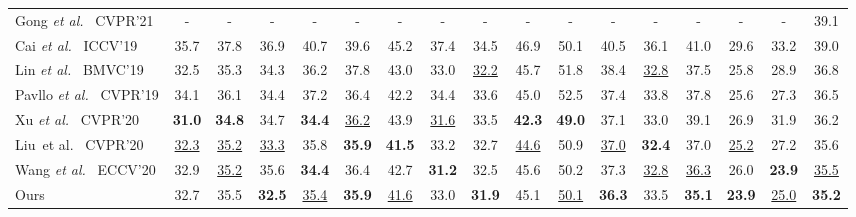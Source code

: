 \documentclass[journal]{IEEEtran}
\begin{document}
\begin{table*}[t]
{\begin{tabular}{@{}l|ccccccccccccccc|c@{}}
Gong \emph{et al.}~\cite{gong2021poseaug} CVPR'21  &- &- &- &- &- &- &- &- &- &- &- &- &- &- &-  &39.1 \\

Cai \emph{et al.}~\cite{cai2019exploiting} ICCV'19   &35.7 &37.8 &36.9 &40.7 &39.6 &45.2 &37.4 &34.5 &46.9 &50.1 &40.5 &36.1 &41.0 &29.6 &33.2 &39.0 \\

Lin \emph{et al.}~\cite{lin2019trajectory} BMVC'19   &32.5 &35.3 &34.3 &36.2 &37.8 &43.0 &33.0 &\underline{32.2} &45.7 &51.8 &38.4 &\underline{32.8} &37.5 &25.8 &28.9 &36.8 \\

Pavllo \emph{et al.}~\cite{pavllo20193d} CVPR'19  &34.1 &36.1 &{34.4} &37.2 &{36.4} &42.2 &34.4 &33.6 &45.0 &52.5 &37.4 &33.8 &37.8 &25.6 &27.3 &36.5\\

Xu \emph{et al.}~\cite{xu2020deep} CVPR'20  &\textbf{31.0} &\textbf{34.8} &34.7 &\textbf{34.4} &\underline{36.2} &43.9 &\underline{31.6} &33.5 &\textbf{42.3} &\textbf{49.0} &37.1 &33.0 &39.1 &26.9 &31.9 &36.2 \\

Liu~et al.~\cite{liu2020attention} CVPR'20  &\underline{32.3} &\underline{35.2} &\underline{33.3} &35.8 &\textbf{35.9} &\textbf{41.5} &33.2 &{32.7} &\underline{44.6} &50.9 &\underline{37.0} &\textbf{32.4} &37.0 &\underline{25.2} &27.2 &35.6 \\

Wang \emph{et al.}~\cite{wang2020motion} ECCV'20   &32.9 &\underline{35.2} &35.6 &\textbf{34.4} &36.4 &42.7 &\textbf{31.2} &{32.5} &45.6 &50.2 &37.3 &\underline{32.8} &\underline{36.3} &26.0 &\textbf{23.9} &\underline{35.5} \\

      \midrule[0.5pt]

      Ours  &{32.7} &{35.5} &\textbf{32.5} &\underline{35.4} &\textbf{35.9} &\underline{41.6} &{33.0} &\textbf{31.9} &{45.1} &\underline{50.1} &\textbf{36.3} &{33.5} &\textbf{35.1} &\textbf{23.9} &\underline{25.0}  &\textbf{35.2} \\

      \toprule[1pt]
      \end{tabular}
   }
   \label{table:h36m}
\end{table*}
\end{document}
